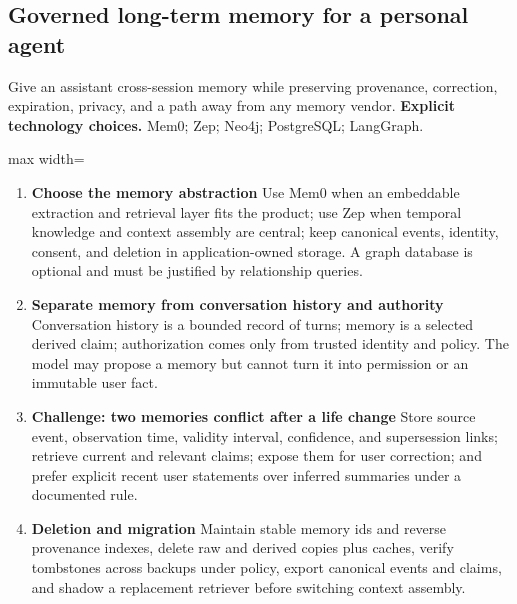 \subsection{Governed long-term memory for a personal agent}
Give an assistant cross-session memory while preserving provenance, correction, expiration, privacy, and a path away from any memory vendor.
\textbf{Explicit technology choices.} Mem0; Zep; Neo4j; PostgreSQL; LangGraph.
\begin{center}\begin{adjustbox}{max width=\linewidth}\end{adjustbox}\end{center}
\begin{enumerate}
\item \textbf{Choose the memory abstraction} Use Mem0 when an embeddable extraction and retrieval layer fits the product; use Zep when temporal knowledge and context assembly are central; keep canonical events, identity, consent, and deletion in application-owned storage. A graph database is optional and must be justified by relationship queries.
\item \textbf{Separate memory from conversation history and authority} Conversation history is a bounded record of turns; memory is a selected derived claim; authorization comes only from trusted identity and policy. The model may propose a memory but cannot turn it into permission or an immutable user fact.
\item \textbf{Challenge: two memories conflict after a life change} Store source event, observation time, validity interval, confidence, and supersession links; retrieve current and relevant claims; expose them for user correction; and prefer explicit recent user statements over inferred summaries under a documented rule.
\item \textbf{Deletion and migration} Maintain stable memory ids and reverse provenance indexes, delete raw and derived copies plus caches, verify tombstones across backups under policy, export canonical events and claims, and shadow a replacement retriever before switching context assembly.
\end{enumerate}
